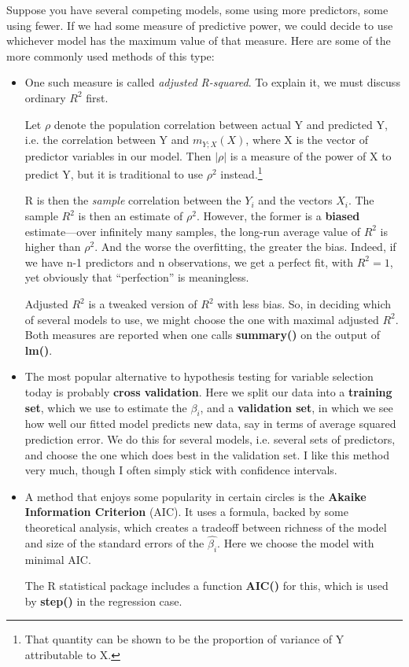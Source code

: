 Suppose you have several competing models, some using more predictors,
some using fewer.  If we had some measure of predictive power, we could
decide to use whichever model has the maximum value of that measure.
Here are some of the more commonly used methods of this type:

\begin{itemize}

\item 
One such measure is called {\it adjusted R-squared}.  To explain it, we
must discuss ordinary $R^2$ first.

Let $\rho$ denote the population correlation between actual Y and
predicted Y, i.e. the correlation between Y and $m_{Y;X}(X)$, where X is
the vector of predictor variables in our model.  Then $|\rho|$ is a
measure of the power of X to predict Y, but it is traditional to use
$\rho^2$ instead.\footnote{That quantity can be shown to be the
proportion of variance of Y attributable to X.}

R is then the {\it sample} correlation between the $Y_i$ and the vectors
$X_i$.  The sample $R^2$ is then an estimate of $\rho^2$.  However, the
former is a {\bf biased} estimate---over infinitely many samples, the
long-run average value of $R^2$ is higher than $\rho^2$.  And the worse
the overfitting, the greater the bias.  Indeed, if we have n-1
predictors and n observations, we get a perfect fit, with $R^2 = 1$, yet
obviously that ``perfection'' is meaningless.

Adjusted $R^2$ is a tweaked version of $R^2$ with less bias.  So, in
deciding which of several models to use, we might choose the one with
maximal adjusted $R^2$.  Both measures are reported when one calls {\bf
summary()} on the output of {\bf lm()}.

\item 
The most popular alternative to hypothesis testing for variable
selection today is probably {\bf cross validation}.  Here we split our
data into a {\bf training set}, which we use to estimate the $\beta_i$,
and a {\bf validation set}, in which we see how well our fitted model
predicts new data, say in terms of average squared prediction error.  We
do this for several models, i.e.  several sets of predictors, and choose
the one which does best in the validation set.  I like this method very
much, though I often simply stick with confidence intervals.

\item 
A method that enjoys some popularity in certain circles is the {\bf
Akaike Information Criterion} (AIC).  It uses a formula, backed by some
theoretical analysis, which creates a tradeoff between richness of the
model and size of the standard errors of the $\hat{\beta_i}$.  Here we
choose the model with minimal AIC.

The R statistical package includes a function {\bf AIC()} for this,
which is used by {\bf step()} in the regression case.

\end{itemize}


